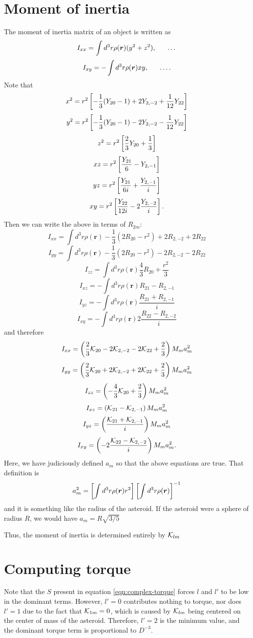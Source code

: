 \documentclass[aps,twocolumn,secnumarabic,balancelastpage,amsmath,amssymb,nofootinbib,floatfix]{revtex4-1}
\begin{document}
\section{Moment of inertia}
The moment of inertia matrix of an object is written as
$$I_{xx}=\int d^3 r \rho(\bm r) (y^2 + z^2), \indent \dots$$
$$I_{xy}=-\int d^3 r \rho(\bm r) xy, \indent \dots.$$
Note that
$$x^2=r^2\left[ -\frac{1}{3}(Y_{20}-1)+2Y_{2,-2}+\frac{1}{12}Y_{22} \right]$$
$$y^2=r^2\left[ -\frac{1}{3}(Y_{20}-1)-2Y_{2,-2}-\frac{1}{12}Y_{22} \right]$$
$$z^2=r^2\left[ \frac{2}{3}Y_{20}+\frac{1}{3} \right]$$
$$xz=r^2\left[ \frac{Y_{21}}{6}-Y_{2,-1} \right]$$
$$yz=r^2\left[ \frac{Y_{21}}{6i}+\frac{Y_{2,-1}}{i} \right]$$
$$xy=r^2\left[ \frac{Y_{22}}{12i}-2\frac{Y_{2,-2}}{i} \right].$$
Then we can write the above in terms of $R_{2m}$:
$$I_{xx}=\int d^3r \rho(\bm r)-\frac{1}{3}(2R_{20}-r^2)+2R_{2,-2}+2R_{22}$$
$$I_{yy}=\int d^3r \rho(\bm r)-\frac{1}{3}(2R_{20}-r^2)-2R_{2,-2}-2R_{22}$$
$$I_{zz}=\int d^3r \rho(\bm r)\frac{4}{3}R_{20}+\frac{r^2}{3}$$
$$I_{xz}=-\int d^3r \rho(\bm r)R_{21}-R_{2,-1}$$
$$I_{yz}=-\int d^3r \rho(\bm r)\frac{R_{21}+R_{2,-1}}{i}$$
$$I_{xy}=-\int d^3r \rho(\bm r)2\frac{R_{22}-R_{2,-2}}{i}$$
and therefore
$$I_{xx}=\left( \frac{2}{3}\mathcal{K}_{20}-2\mathcal{K}_{2,-2}-2\mathcal{K}_{22}+\frac{2}{3} \right)M_ma_m^2$$
$$I_{yy}=\left( \frac{2}{3}\mathcal{K}_{20}+2\mathcal{K}_{2,-2}+2\mathcal{K}_{22}+\frac{2}{3} \right)M_ma_m^2$$
$$I_{zz}=\left( -\frac{4}{3}\mathcal{K}_{20} + \frac{2}{3} \right)M_ma_m^2$$
$$I_{xz}=\left( \mathcal{K}_{21}-\mathcal{K}_{2,-1} \right)M_ma_m^2$$
$$I_{yz}=\left( \frac{\mathcal{K}_{21}+\mathcal{K}_{2,-1}}{i} \right)M_ma_m^2$$
$$I_{xy}=\left( -2\frac{\mathcal{K}_{22}-\mathcal{K}_{2,-2}}{i} \right)M_ma_m^2.$$
Here, we have judiciously defined $a_m$ so that the above equations are true. That definition is
\begin{equation}
a_m^2 = \left[ \int d^3 r \rho(\bm r) r^2 \right]\left[ \int d^3 r \rho(\bm r) \right]^{-1}
\label{eqn:am}
\end{equation}
and it is something like the radius of the asteroid. If the asteroid were a sphere of radius $R$, we would have $a_m = R\sqrt{3/5}$

Thus, the moment of inertia is determined entirely by $\mathcal{K}_{lm}$



\section{Computing torque}
Note that the $S$ present in equation \ref{eqn:complex-torque} forces $l$ and $l'$ to be low in the dominant terms. However, $l'=0$ contributes nothing to torque, nor does $l'=1$ due to the fact that $\mathcal{K}_{1m}=0$, which is caused by $\mathcal{K}_{lm}$ being centered on the center of mass of the asteroid. Therefore, $l'=2$ is the minimum value, and the dominant torque term is proportional to $D^{-3}$.
\end{document}
